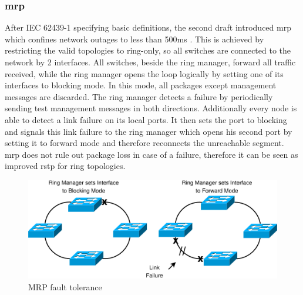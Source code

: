 \subsubsection{\gls{mrp}}
After IEC 62439-1 specifying basic definitions, the second draft introduced \gls{mrp} which confines network outages to less than 500ms \cite{6145654}.
This is achieved by restricting the valid topologies to ring-only, so all switches are connected to the network by 2 interfaces. All switches, beside the ring manager,
forward all traffic received, while the ring manager opens the loop logically by setting one of its interfaces to blocking mode.
In this mode, all packages except management messages are discarded. The ring manager detects a failure by periodically sending test management messages in both
directions. Additionally every node is able to detect a link failure on its local ports. It then sets the port to blocking and signals this link failure to the
ring manager which opens his second port by setting it to forward mode and therefore reconnects the unreachable segment.
\\
\gls{mrp} does not rule out package loss in case of a failure, therefore it can be seen as improved \gls{rstp} for ring topologies. 

\begin{figure}[H]
 \includegraphics[width=\linewidth]{figures/MRP2.eps}
 \caption{MRP fault tolerance}
\label{fig:mrp1}
\end{figure}


